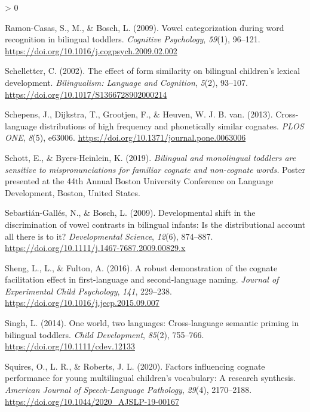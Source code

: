 \documentclass[
  english,
  ,man,floatsintext]{apa6}
\newlength{\cslhangindent}
\newenvironment{CSLReferences}[2] %
 {%
  \setlength{\parindent}{0pt}
  \ifodd #1 \everypar{\setlength{\hangindent}{\cslhangindent}}\ignorespaces\fi
  \ifnum #2 > 0
  \setlength{\parskip}{#2\baselineskip}
  \fi
 }%
 {}
\begin{document}
\begin{CSLReferences}{1}{0}
\leavevmode\hypertarget{ref-Ramon-Casas_etal_2009}{}%
Ramon-Casas, S., M., \& Bosch, L. (2009). Vowel categorization during word recognition in bilingual toddlers. \emph{Cognitive Psychology}, \emph{59}(1), 96--121. \url{https://doi.org/10.1016/j.cogpsych.2009.02.002}

\leavevmode\hypertarget{ref-Schelletter_2002}{}%
Schelletter, C. (2002). The effect of form similarity on bilingual children's lexical development. \emph{Bilingualism: Language and Cognition}, \emph{5}(2), 93--107. \url{https://doi.org/10.1017/S1366728902000214}

\leavevmode\hypertarget{ref-Schepens_etal_2013}{}%
Schepens, J., Dijkstra, T., Grootjen, F., \& Heuven, W. J. B. van. (2013). Cross-language distributions of high frequency and phonetically similar cognates. \emph{PLOS ONE}, \emph{8}(5), e63006. \url{https://doi.org/10.1371/journal.pone.0063006}

\leavevmode\hypertarget{ref-Schott_Byers-Heinlein_2019}{}%
Schott, E., \& Byers-Heinlein, K. (2019). \emph{Bilingual and monolingual toddlers are sensitive to mispronunciations for familiar cognate and non-cognate words.} Poster presented at the 44th Annual Boston University Conference on Language Development, Boston, United States.

\leavevmode\hypertarget{ref-Sebastiuxe1n-Galluxe9s_Bosch_2009}{}%
Sebastián-Gallés, N., \& Bosch, L. (2009). Developmental shift in the discrimination of vowel contrasts in bilingual infants: Is the distributional account all there is to it? \emph{Developmental Science}, \emph{12}(6), 874--887. \url{https://doi.org/10.1111/j.1467-7687.2009.00829.x}

\leavevmode\hypertarget{ref-Sheng_etal_2016}{}%
Sheng, L., L., \& Fulton, A. (2016). A robust demonstration of the cognate facilitation effect in first-language and second-language naming. \emph{Journal of Experimental Child Psychology}, \emph{141}, 229--238. \url{https://doi.org/10.1016/j.jecp.2015.09.007}

\leavevmode\hypertarget{ref-Singh_2014}{}%
Singh, L. (2014). One world, two languages: Cross-language semantic priming in bilingual toddlers. \emph{Child Development}, \emph{85}(2), 755--766. \url{https://doi.org/10.1111/cdev.12133}

\leavevmode\hypertarget{ref-Squirres_etal_2020}{}%
Squires, O., L. R., \& Roberts, J. L. (2020). Factors influencing cognate performance for young multilingual children's vocabulary: A research synthesis. \emph{American Journal of Speech-Language Pathology}, \emph{29}(4), 2170--2188. \url{https://doi.org/10.1044/2020_AJSLP-19-00167}


\end{CSLReferences}
\end{document}
